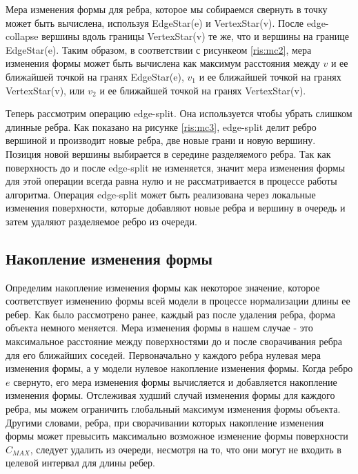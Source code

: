 \documentclass[14pt]{article}
\numberwithin{figure}{section}
\numberwithin{equation}{section}
\begin{document}
Мера изменения формы для ребра, которое мы собираемся свернуть в точку может быть вычислена, используя EdgeStar(e) и VertexStar(v). После edge-collapse вершины вдоль границы VertexStar(v) те же, что и вершины на границе EdgeStar(e). Таким образом, в соответствии с рисункеом \ref{ris:mc2}, мера изменения формы может быть вычислена как максимум расстояния между $v$ и ее ближайшей точкой на гранях EdgeStar(e), $v_1$ и ее ближайшей точкой на гранях VertexStar(v), или $v_2$ и ее ближайшей точкой на гранях VertexStar(v).


Теперь рассмотрим операцию edge-split. Она используется чтобы убрать слишком длинные ребра. Как показано на рисунке \ref{ris:mc3}, edge-split делит ребро вершиной и производит новые ребра, две новые грани и новую вершину. Позиция новой вершины выбирается в середине разделяемого ребра. Так как поверхность до и после edge-split не изменяется, значит мера изменения формы для этой операции всегда равна нулю и не рассматривается в процессе работы алгоритма. Операция edge-split может быть реализована через локальные изменения поверхности, которые добавляют новые ребра и вершину в очередь и затем удаляют разделяемое ребро из очереди.

\subsection{Накопление изменения формы}

Определим накопление изменения формы как некоторое значение, которое соответствует изменению формы всей модели в процессе нормализации длины ее ребер. Как было рассмотрено ранее, каждый раз после удаления ребра, форма объекта немного меняется. Мера изменения формы в нашем случае - это максимальное расстояние между поверхностями до и после сворачивания ребра для его ближайших соседей.
Первоначально у каждого ребра нулевая мера изменения формы, а у модели нулевое накопление изменения формы. Когда ребро $e$ свернуто, его мера изменения формы вычисляется и добавляется накопление изменения формы. Отслеживая худший случай изменения формы для каждого ребра, мы можем ограничить глобальный максимум изменения формы объекта. Другими словами, ребра, при сворачивании которых накопление изменения формы может превысить максимально возможное изменение формы поверхности $C_{MAX}$, следует удалить из очереди, несмотря на то, что они могут не входить в целевой интервал для длины ребер.
\end{document}

